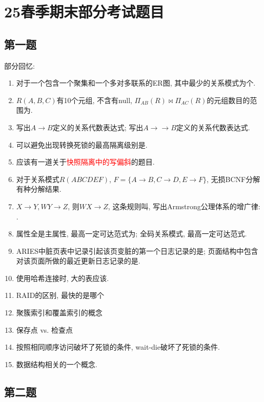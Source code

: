 \section{25春季期末部分考试题目}

\subsection{第一题}

部分回忆:
\begin{enumerate}
    \item 对于一个包含一个聚集和一个多对多联系的ER图, 其中最少的关系模式为\underline{\quad}个.
    \item $R(A,B,C)$有10个元组, 不含有null, $\Pi_{AB}(R) \bowtie \Pi_{AC}(R)$的元组数目的范围为\underline{\quad}.
    \item 写出$A\to B$定义的关系代数表达式\underline{\quad}; 写出$A\to \to B$定义的关系代数表达式.
    \item 可以避免出现转换死锁的最高隔离级别是\underline{\quad}.
    \item 应该有一道关于\textcolor{red}{快照隔离中的写偏斜}的题目.
    \item 对于关系模式$R(ABCDEF)$, $F=\{A\to B,C\to D, E\to F\}$, 无损BCNF分解有\underline{\quad}种分解结果.
    \item $X\to Y, WY\to Z$, 则$WX\to Z$, 这条规则叫\underline{\quad}, 写出Armstrong公理体系的增广律: \underline{\quad}.
    \item 属性全是主属性, 最高一定可达范式为\underline{\quad}; 全码关系模式, 最高一定可达范式.
    \item ARIES中脏页表中记录引起该页变脏的第一个日志记录的是\underline{\quad}; 页面结构中包含对该页面所做的最近更新日志记录的是\underline{\quad}.
    \item 使用哈希连接时, 大的表应该\underline{\quad}.
    \item RAID的区别, 最快的是哪个
    \item 聚簇索引和覆盖索引的概念
    \item 保存点 vs. 检查点
    \item 按照相同顺序访问破坏了死锁的\underline{\quad}条件, wait-die破坏了死锁的\underline{\quad}条件.
    \item 数据结构相关的一个概念.
\end{enumerate}

\subsection{第二题}

